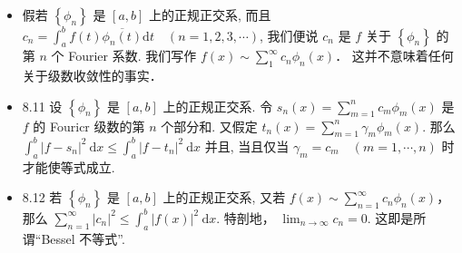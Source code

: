 \begin{itemize}
\item 假若 $\left\{\phi_{n}\right\}$ 是 $[a, b]$ 上的正规正交系, 而且 $c_{n}=\int_{a}^{b} f(t) \overline{\phi_{n}(t)} \mathrm{d} t \quad(n=1,2,3, \cdots)$, 我们便说 $c_{n}$ 是 $f$ 关于 $\left\{\phi_{n}\right\}$ 的第 $n$ 个 Fourier 系数. 我们写作 $f(x) \sim \sum_{1}^{\infty} c_{n} \phi_{n}(x)$． 这并不意味着任何关于级数收敛性的事实．

\item 8.11 设 $\left\{\phi_{n}\right\}$ 是 $[a, b]$ 上的正规正交系. 令 $s_{n}(x)=\sum_{m=1}^{n} c_{m} \phi_{m}(x)$ 是 $f$ 的 Fouricr 级数的第 $n$ 个部分和. 又假定 $t_{n}(x)=\sum_{m=1}^{n} \gamma_{m} \phi_{m}(x) .$ 那么 $\int_{a}^{b}\left|f-s_{n}\right|^{2} \mathrm{~d} x \leqslant \int_{a}^{b}\left|f-t_{n}\right|^{2} \mathrm{~d} x$ 并且, 当且仅当 $\gamma_{m}=c_{m} \quad(m=1, \cdots, n)$ 时才能使等式成立.

\item 8.12 若 $\left\{\phi_{n}\right\}$ 是 $[a, b]$ 上的正规正交系, 又若 $f(x) \sim \sum_{n=1}^{\infty} c_{n} \phi_{n}(x)$， 那么 $\sum_{n=1}^{\infty}\left|c_{n}\right|^{2} \leqslant \int_{a}^{b}|f(x)|^{2} \mathrm{~d} x$. 特剖地， $\lim _{n \rightarrow \infty} c_{n}=0$. 这即是所谓“Bessel 不等式”.
\end{itemize}

